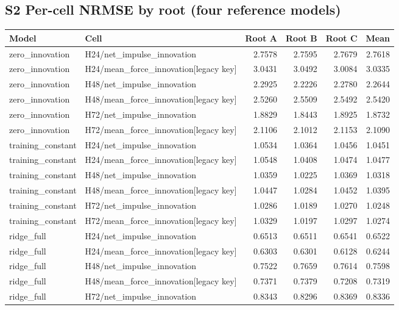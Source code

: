 \documentclass[9pt,a4paper]{extarticle}
\begin{document}
\subsection*{S2 Per-cell NRMSE by root (four reference models)}\small
\begin{longtable}{llrrrr}
\toprule
Model & Cell & Root A & Root B & Root C & Mean \\
\midrule
\endhead
zero\_innovation & H24/net\_impulse\_innovation & 2.7578 & 2.7595 & 2.7679 & 2.7618 \\
zero\_innovation & H24/mean\_force\_innovation[legacy key] & 3.0431 & 3.0492 & 3.0084 & 3.0335 \\
zero\_innovation & H48/net\_impulse\_innovation & 2.2925 & 2.2226 & 2.2780 & 2.2644 \\
zero\_innovation & H48/mean\_force\_innovation[legacy key] & 2.5260 & 2.5509 & 2.5492 & 2.5420 \\
zero\_innovation & H72/net\_impulse\_innovation & 1.8829 & 1.8443 & 1.8925 & 1.8732 \\
zero\_innovation & H72/mean\_force\_innovation[legacy key] & 2.1106 & 2.1012 & 2.1153 & 2.1090 \\
training\_constant & H24/net\_impulse\_innovation & 1.0534 & 1.0364 & 1.0456 & 1.0451 \\
training\_constant & H24/mean\_force\_innovation[legacy key] & 1.0548 & 1.0408 & 1.0474 & 1.0477 \\
training\_constant & H48/net\_impulse\_innovation & 1.0359 & 1.0225 & 1.0369 & 1.0318 \\
training\_constant & H48/mean\_force\_innovation[legacy key] & 1.0447 & 1.0284 & 1.0452 & 1.0395 \\
training\_constant & H72/net\_impulse\_innovation & 1.0286 & 1.0189 & 1.0270 & 1.0248 \\
training\_constant & H72/mean\_force\_innovation[legacy key] & 1.0329 & 1.0197 & 1.0297 & 1.0274 \\
ridge\_full & H24/net\_impulse\_innovation & 0.6513 & 0.6511 & 0.6541 & 0.6522 \\
ridge\_full & H24/mean\_force\_innovation[legacy key] & 0.6303 & 0.6301 & 0.6128 & 0.6244 \\
ridge\_full & H48/net\_impulse\_innovation & 0.7522 & 0.7659 & 0.7614 & 0.7598 \\
ridge\_full & H48/mean\_force\_innovation[legacy key] & 0.7371 & 0.7379 & 0.7208 & 0.7319 \\
ridge\_full & H72/net\_impulse\_innovation & 0.8343 & 0.8296 & 0.8369 & 0.8336 \\

\end{longtable}
\end{document}
